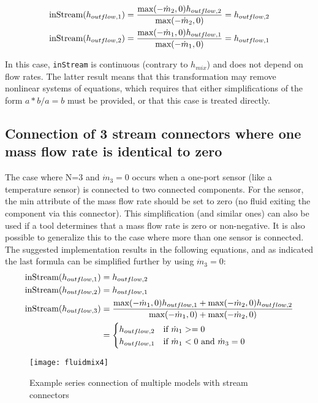 \begin{align*}
\text{\lstinline!inStream!}(h_{outflow,1}) &= \frac{\text{max}(-\dot{m}_2,0)h_{outflow,2}}{\text{max}(-\dot{m}_2,0)}=h_{outflow,2}\\
\text{\lstinline!inStream!}(h_{outflow,2}) &= \frac{\text{max}(-\dot{m}_1,0)h_{outflow,1}}{\text{max}(-\dot{m}_1,0)}=h_{outflow,1}
\end{align*}

In this case, \lstinline!inStream! is continuous (contrary to $h_{mix}$) and does not
depend on flow rates. The latter result means that this transformation
may remove nonlinear systems of equations, which requires that either
simplifications of the form $a * b / a = b$ must be provided, or that this
case is treated directly.

\subsection{Connection of 3 stream connectors where one mass flow rate is identical to zero}\label{connection-of-3-stream-connectors-where-one-mass-flow-rate-is-identical-to-zero-n-3-and}
The case where N=3 and $\dot{m}_3=0$ occurs when a one-port sensor (like a temperature sensor) is
connected to two connected components. For the sensor, the min attribute
of the mass flow rate should be set to zero (no fluid exiting the
component via this connector).
This simplification (and similar ones) can also be used if a tool determines that a mass flow rate is zero or non-negative.
It is also possible to generalize this to the case where more than one sensor is connected.
The suggested implementation results in
the following equations, and as indicated the last formula can be
simplified further by using $\dot{m}_3=0$:
\begin{align*}
\text{\lstinline!inStream!}(h_{outflow,1}) &= h_{outflow,2}\\
\text{\lstinline!inStream!}(h_{outflow,2}) &= h_{outflow,1}\\
\text{\lstinline!inStream!}(h_{outflow,3}) &= \frac{\text{max}(-\dot{m}_1,0)h_{outflow,1}+\text{max}(-\dot{m}_2,0)h_{outflow,2}}{\text{max}(-\dot{m}_1,0)+\text{max}(-\dot{m}_2,0)}\\
&=
\begin{cases}
h_{outflow,2}&\text{if $\dot{m}_1>=0$}\\
h_{outflow,1}&\text{if $\dot{m}_1<0$ and $\dot{m}_3=0$}
\end{cases}
\end{align*}
\begin{figure}[H]
\caption{Example series connection of multiple models with stream connectors }
\begin{center}
\texttt{[image: fluidmix4]}
\end{center}
\end{figure}

